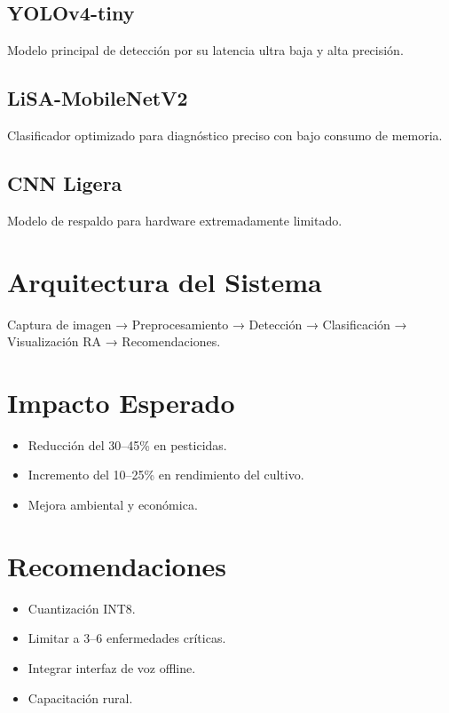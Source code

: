 \documentclass[12pt]{article}
\begin{document}
\subsection{YOLOv4-tiny}
Modelo principal de detección por su latencia ultra baja y alta precisión.

\subsection{LiSA-MobileNetV2}
Clasificador optimizado para diagnóstico preciso con bajo consumo de memoria.

\subsection{CNN Ligera}
Modelo de respaldo para hardware extremadamente limitado.

\section{Arquitectura del Sistema}
Captura de imagen → Preprocesamiento → Detección → Clasificación → Visualización RA → Recomendaciones.

\section{Impacto Esperado}
\begin{itemize}
\item Reducción del 30–45\% en pesticidas.
\item Incremento del 10–25\% en rendimiento del cultivo.
\item Mejora ambiental y económica.
\end{itemize}

\section{Recomendaciones}
\begin{itemize}
\item Cuantización INT8.
\item Limitar a 3–6 enfermedades críticas.
\item Integrar interfaz de voz offline.
\item Capacitación rural.
\end{itemize}
\end{document}
